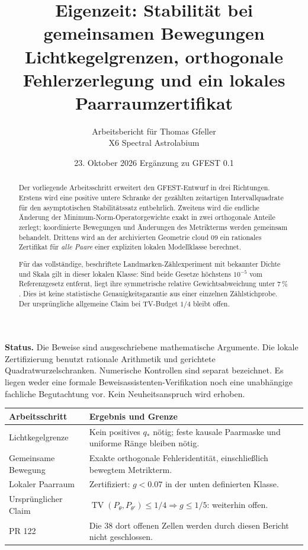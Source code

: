 \documentclass[11pt,a4paper]{article}
\title{\textbf{Eigenzeit: Stabilität bei gemeinsamen Bewegungen}\\[5pt]\large Lichtkegelgrenzen, orthogonale Fehlerzerlegung und ein lokales Paarraumzertifikat}
\author{Arbeitsbericht für Thomas Gfeller\\\small X6 Spectral Astrolabium}
\date{23. Oktober 2026 \quad Ergänzung zu GFEST 0.1}
\newcommand{\TV}{\operatorname{TV}}\newcommand{\Pois}{\operatorname{Pois}}
\begin{document}
\maketitle\thispagestyle{fancy}
\begin{abstract}
Der vorliegende Arbeitsschritt erweitert den GFEST-Entwurf in drei Richtungen. Erstens wird eine positive untere Schranke der gezählten zeitartigen Intervallquadrate für den asymptotischen Stabilitätssatz entbehrlich. Zweitens wird die endliche Änderung der Minimum-Norm-Operatorgewichte exakt in zwei orthogonale Anteile zerlegt; koordinierte Bewegungen und Änderungen des Metrikterms werden gemeinsam behandelt. Drittens wird an der archivierten Geometrie cloud 09 ein rationales Zertifikat für \emph{alle Paare} einer expliziten lokalen Modellklasse berechnet.

Für das vollständige, beschriftete Landmarken-Zählexperiment mit bekannter Dichte und Skala gilt in dieser lokalen Klasse: Sind beide Gesetze höchstens $10^{-5}$ vom Referenzgesetz entfernt, liegt ihre symmetrische relative Gewichtsabweichung unter $7\,\%$. Dies ist keine statistische Genauigkeitsgarantie aus einer einzelnen Zählstichprobe. Der ursprüngliche allgemeine Claim bei TV-Budget $1/4$ bleibt offen.
\end{abstract}

\textbf{Status.} Die Beweise sind ausgeschriebene mathematische Argumente. Die lokale Zertifizierung benutzt rationale Arithmetik und gerichtete Quadratwurzelschranken. Numerische Kontrollen sind separat bezeichnet. Es liegen weder eine formale Beweisassistenten-Verifikation noch eine unabhängige fachliche Begutachtung vor. Kein Neuheitsanspruch wird erhoben.

\begin{center}\begin{tabularx}{\linewidth}{@{}lX@{}}\toprule
Arbeitsschritt & Ergebnis und Grenze\\\midrule
Lichtkegelgrenze & Kein positives $q_*$ nötig; feste kausale Paarmaske und uniforme Ränge bleiben nötig.\\
Gemeinsame Bewegung & Exakte orthogonale Fehleridentität, einschließlich bewegtem Metrikterm.\\
Lokaler Paarraum & Zertifiziert: $g<0.07$ in der unten definierten Klasse.\\
Ursprünglicher Claim & $\TV(P_\theta,P_{\theta'})\leq1/4\Rightarrow g\leq1/5$: weiterhin offen.\\
PR 122 & Die 38 dort offenen Zellen werden durch diesen Bericht nicht geschlossen.\\\bottomrule
\end{tabularx}\end{center}
\end{document}
